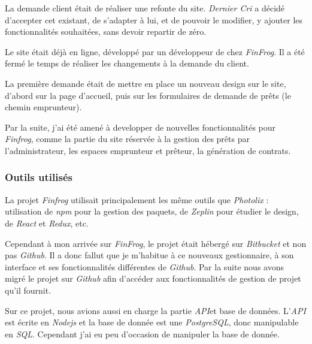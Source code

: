 \documentclass[12pt,a4paper]{article}
\begin{document}
  \bigskip
  La demande client était de réaliser une refonte du site. \emph{Dernier
  Cri} a décidé d'accepter cet existant, de s'adapter à lui, et de pouvoir
  le modifier, y ajouter les fonctionnalités souhaitées, sans devoir
  repartir de zéro.

  \bigskip

  Le site était déjà en ligne, développé par un développeur de chez
  \emph{FinFrog}. Il a été fermé le temps de réaliser les changements à la
  demande du client.

  \bigskip

  La première demande était de mettre en place un nouveau design sur le
  site, d'abord sur la page d'accueil, puis sur les formulaires de demande
  de prêts (le chemin emprunteur).

  \bigskip

  Par la suite, j'ai été amené à developper de nouvelles fonctionnalités
  pour \emph{Finfrog}, comme la partie du site réservée à la gestion des
  prêts par l'administrateur, les espaces emprunteur et prêteur, la
  génération de contrats.

  \bigskip

  \subsubsection{Outils utilisés}\label{outils-utilisuxe9s-1}

  \bigskip

  La projet \emph{Finfrog} utilisait principalement les même outils que
  \emph{Photolix} : utilisation de \emph{npm} pour la gestion des paquets,
  de \emph{Zeplin} pour étudier le design, de \emph{React} et
  \emph{Redux}, etc.

  \bigskip

  Cependant à mon arrivée sur \emph{FinFrog}, le projet était hébergé sur
  \emph{Bitbucket} et non pas \emph{Github}. Il a donc fallut que je
  m'habitue à ce nouveaux gestionnaire, à son interface et ses
  fonctionnalités différentes de \emph{Github}. Par la suite nous avons
  migré le projet sur \emph{Github} afin d'accéder aux fonctionnalités de
  gestion de projet qu'il fournit.

  \bigskip

  Sur ce projet, nous avions aussi en charge la partie \emph{API}et base
  de données. L'\emph{API} est écrite en \emph{Nodejs} et la base de
  donnée est une \emph{PostgreSQL}, donc manipulable en \emph{SQL}.
  Cependant j'ai eu peu d'occasion de manipuler la base de donnée.
\end{document}
